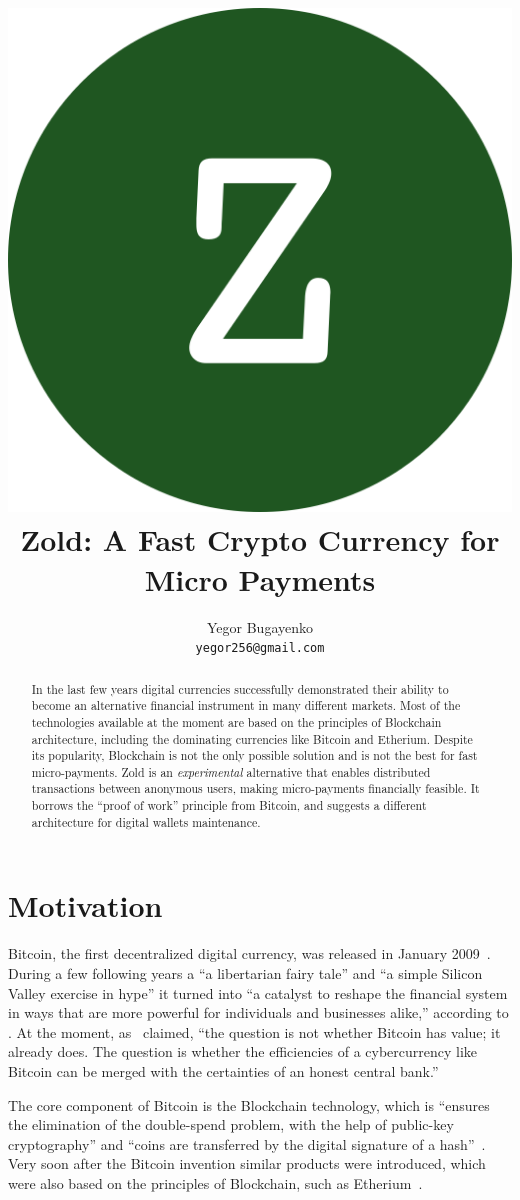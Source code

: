 \documentclass[11pt,oneside]{article}
\title{\includegraphics[scale=0.05]{logo.png}\\Zold: A Fast Crypto Currency for Micro Payments}
\author{Yegor Bugayenko\\\texttt{yegor256@gmail.com}}
\begin{document}
\raggedbottom

\maketitle
\begin{abstract}
In the last few years digital currencies successfully demonstrated
their ability to become an alternative financial instrument in many
different markets. Most of the technologies available at the moment are
based on the principles of Blockchain architecture, including the
dominating currencies like Bitcoin and Etherium. Despite its
popularity, Blockchain is not the only possible solution and is not the best
for fast micro-payments.
Zold is an \emph{experimental} alternative that enables distributed transactions between
anonymous users, making micro-payments financially feasible.
It borrows the ``proof of work'' principle from Bitcoin,
and suggests a different architecture for digital wallets maintenance.
\end{abstract}

\section{Motivation}

Bitcoin, the first decentralized digital currency, was released in January 2009~\parencite{nakamoto2008}.
During a few following years a ``a libertarian fairy tale'' and ``a simple Silicon Valley exercise in hype''
it turned into ``a catalyst to reshape the financial system in ways that are more
powerful for individuals and businesses alike,'' according to \textcite{andreessen2014}.
At the moment, as~\textcite{van2014} claimed, ``the question is not whether Bitcoin has value; it already does.
The question is whether the efficiencies of a cybercurrency
like Bitcoin can be merged with the certainties of an honest central bank.''

The core component of Bitcoin is the Blockchain technology, which is
``ensures the elimination of the double-spend problem, with the help
of public-key cryptography'' and ``coins are transferred by the
digital signature of a hash''~\parencite{pilkington2016}.
Very soon after the Bitcoin invention similar products were introduced,
which were also based on the principles of Blockchain, such as
Etherium~\parencite{buterin2013}.
\end{document}
